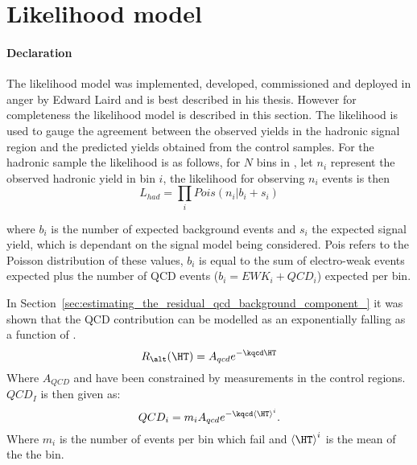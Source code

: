 \section{Likelihood model} %
\label{sec:likelihood_model}
\paragraph{Declaration} %
\label{par:declaration-likelihood}
The likelihood model was implemented, developed, commissioned and deployed in 
anger by Edward Laird and is best described in his thesis\cite{ted}. However 
for completeness the likelihood model is described in this section.
The likelihood is used to gauge the agreement between the observed yields in 
the hadronic signal region and the predicted yields obtained from the control 
samples.
For the hadronic sample the likelihood is as follows, for $N$ bins in \HT, let 
$n_{i}$ represent the observed hadronic yield in \HT bin $i$, the likelihood 
for observing $n_{i}$ events is then
\begin{equation}
  L_{had} = \prod_{i}Pois\left(n_{i}|b_{i}+s_{i}\right)
\label{eqn:l_had}
\end{equation}

where $b_{i}$ is the number of expected background events and $s_{i}$ the 
expected signal yield, which is dependant on the signal model being considered.
Pois refers to the Poisson distribution of these values, $b_{i}$ is equal to 
the sum of electro-weak events expected plus the number of QCD events ($b_{i} = 
EWK_{i}+QCD_{i}$) expected per bin.

In Section~\ref{sec:estimating_the_residual_qcd_background_component_} it was 
shown that the QCD contribution can be modelled as an exponentially falling as 
a function of \HT.
\begin{equation}
  R_{\alt}(\HT) = A_{qcd}e^{-\kqcd \HT}
\end{equation}
Where $A_{QCD}$ and \kqcd have been constrained by measurements in the control regions. $QCD_{I}$ is then given as:
\begin{equation}
  QCD_{i} = m_{i}A_{qcd}e^{-\kqcd \left<\HT\right>^{i}}.
  \label{eqn:qcdi}
\end{equation}
Where $m_{i}$ is the number of events per \HT bin which fail \altg and $\left<\HT\right>^{i}$ is the mean \HT of the the bin.


